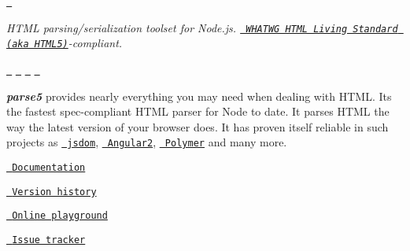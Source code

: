 

\href{https://github.com/inikulin/parse5}{\texttt{  }} 



{\itshape HTML parsing/serialization toolset for Node.\+js. \href{https://html.spec.whatwg.org/multipage/}{\texttt{ WHATWG HTML Living Standard (aka HTML5)}}-\/compliant.} 



\href{https://travis-ci.org/inikulin/parse5}{\texttt{ }} \href{https://www.npmjs.com/package/parse5}{\texttt{ }} \href{https://npmjs.org/package/parse5}{\texttt{ }} \href{https://npmjs.org/package/parse5}{\texttt{ }} 



{\bfseries{{\itshape parse5}}} provides nearly everything you may need when dealing with HTML. It\textquotesingle{}s the fastest spec-\/compliant HTML parser for Node to date. It parses HTML the way the latest version of your browser does. It has proven itself reliable in such projects as \href{https://github.com/tmpvar/jsdom}{\texttt{ jsdom}}, \href{https://github.com/angular/angular}{\texttt{ Angular2}}, \href{https://www.polymer-project.org}{\texttt{ Polymer}} and many more. 





\href{http://inikulin.github.io/parse5}{\texttt{ Documentation}} 



\href{http://inikulin.github.io/parse5\#version-history}{\texttt{ Version history}} 



\href{http://astexplorer.net/\#/1CHlCXc4n4}{\texttt{ Online playground}} 



\href{https://github.com/inikulin/parse5/issues}{\texttt{ Issue tracker}} 